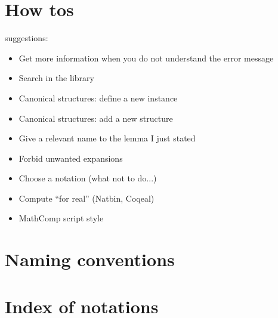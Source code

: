 \documentclass{book}
\begin{document}
\chapter{How tos}
suggestions:
\begin{itemize}
\item Get more information when you do not understand the error
  message
\item Search in the library
\item Canonical structures: define a new instance
\item Canonical structures: add a new structure
\item Give a relevant name to the lemma I just stated
\item Forbid unwanted expansions
\item Choose a notation (what not to do...)
\item Compute ``for real'' (Natbin, Coqeal)
\item MathComp script style
\end{itemize}
\chapter{Naming conventions}

\chapter{Index of notations}



\end{document}
